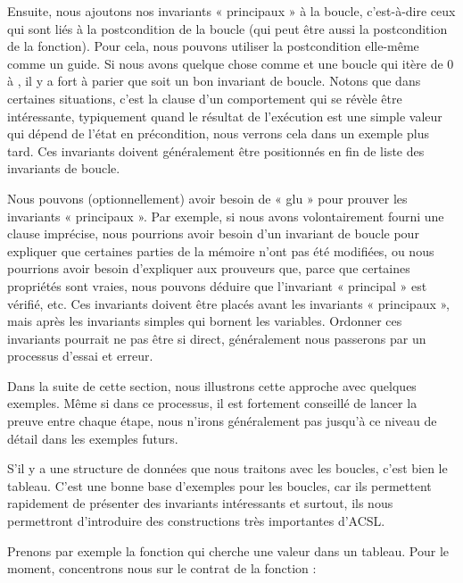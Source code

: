 Ensuite, nous ajoutons nos invariants « principaux » à la boucle, c'est-à-dire
ceux qui sont liés à la postcondition de la boucle (qui peut être aussi la
postcondition de la fonction). Pour cela, nous pouvons utiliser la postcondition
elle-même comme un guide. Si nous avons quelque chose comme
 et une boucle qui itère  de 0 à
, il y a fort à parier que  soit
un bon invariant de boucle. Notons que dans certaines situations, c'est la
clause  d'un comportement qui se révèle être intéressante,
typiquement quand le résultat de l'exécution est une simple valeur qui dépend
de l'état en précondition, nous verrons cela dans un exemple plus tard. Ces
invariants doivent généralement être positionnés en fin de liste des invariants
de boucle.


Nous pouvons (optionnellement) avoir besoin de « glu » pour prouver les
invariants « principaux ». Par exemple, si nous avons volontairement fourni
une clause  imprécise, nous pourrions avoir besoin
d'un invariant de boucle pour expliquer que certaines parties de la mémoire
n'ont pas été modifiées, ou nous pourrions avoir besoin d'expliquer aux
prouveurs que, parce que certaines propriétés sont vraies, nous pouvons déduire
que l'invariant « principal » est vérifié, etc. Ces invariants doivent être
placés avant les invariants « principaux », mais après les invariants simples
qui bornent les variables. Ordonner ces invariants pourrait ne pas être si
direct, généralement nous passerons par un processus d'essai et erreur.


Dans la suite de cette section, nous illustrons cette approche avec quelques
exemples. Même si dans ce processus, il est fortement conseillé de lancer la
preuve entre chaque étape, nous n'irons généralement pas jusqu'à ce niveau de
détail dans les exemples futurs.


\label{l3:statements-loops-examples-ro}


S'il y a une structure de données que nous traitons avec les boucles, c'est bien
le tableau. C'est une bonne base d'exemples pour les boucles, car ils permettent
rapidement de présenter des invariants intéressants et surtout, ils nous
permettront d'introduire des constructions très importantes d'ACSL.


Prenons par exemple la fonction qui cherche une valeur dans un tableau. Pour le
moment, concentrons nous sur le contrat de la fonction :


